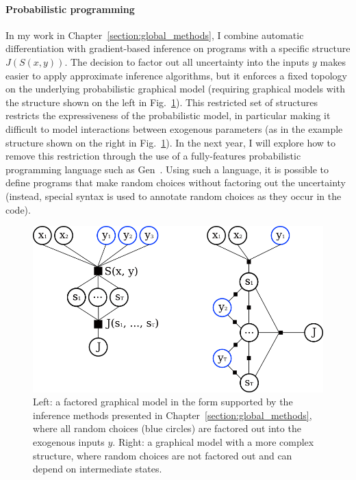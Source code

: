 \paragraph{Probabilistic programming} In my work in Chapter~\ref{section:global_methods}, I combine automatic differentiation with gradient-based inference on programs with a specific structure $J(S(x, y))$. The decision to factor out all uncertainty into the inputs $y$ makes easier to apply approximate inference algorithms, but it enforces a fixed topology on the underlying probabilistic graphical model (requiring graphical models with the structure shown on the left in Fig.~\ref{ch7:fig:graphical_models}). This restricted set of structures restricts the expressiveness of the probabilistic model, in particular making it difficult to model interactions between exogenous parameters (as in the example structure shown on the right in Fig.~\ref{ch7:fig:graphical_models}). In the next year, I will explore how to remove this restriction through the use of a fully-features probabilistic programming language such as Gen~\cite{Cusumano-Towner:2019:GGP:3314221.3314642}. Using such a language, it is possible to define programs that make random choices without factoring out the uncertainty (instead, special syntax is used to annotate random choices as they occur in the code).

\begin{figure}[b]
    \centering
    \includegraphics[width=0.8\linewidth]{images/ch7/graphs.png}
    \caption{Left: a factored graphical model in the form supported by the inference methods presented in Chapter~\ref{section:global_methods}, where all random choices (blue circles) are factored out into the exogenous inputs $y$. Right: a graphical model with a more complex structure, where random choices are not factored out and can depend on intermediate states.}
    \label{ch7:fig:graphical_models}
\end{figure}


